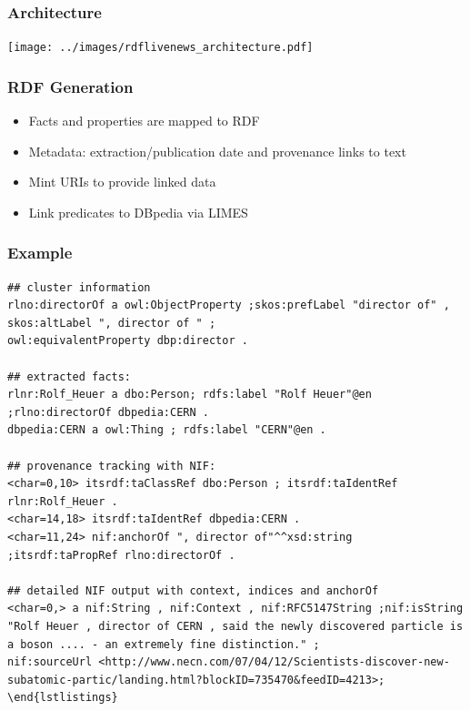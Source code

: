 \documentclass{beamer}
\begin{document}
\begin{frame}
    \frametitle{Architecture}
        \texttt{[image: ../images/rdflivenews\_architecture.pdf]}
\end{frame}



\begin{frame}
    \frametitle{RDF Generation}
    \begin{itemize}
        \item Facts and properties are mapped to RDF
        \item Metadata: extraction/publication date and provenance links to text
        \item Mint URIs to provide linked data
        \item Link predicates to DBpedia via LIMES
    \end{itemize}
\end{frame}


\begin{frame}[fragile]
\frametitle{Example}
    \begin{lstlisting}
## cluster information
rlno:directorOf a owl:ObjectProperty ;skos:prefLabel "director of" ,
skos:altLabel ", director of " ;
owl:equivalentProperty dbp:director .

## extracted facts:
rlnr:Rolf_Heuer a dbo:Person; rdfs:label "Rolf Heuer"@en ;rlno:directorOf dbpedia:CERN .
dbpedia:CERN a owl:Thing ; rdfs:label "CERN"@en .

## provenance tracking with NIF:
<char=0,10> itsrdf:taClassRef dbo:Person ; itsrdf:taIdentRef rlnr:Rolf_Heuer .
<char=14,18> itsrdf:taIdentRef dbpedia:CERN .
<char=11,24> nif:anchorOf ", director of"^^xsd:string ;itsrdf:taPropRef rlno:directorOf .

## detailed NIF output with context, indices and anchorOf
<char=0,> a nif:String , nif:Context , nif:RFC5147String ;nif:isString "Rolf Heuer , director of CERN , said the newly discovered particle is a boson .... - an extremely fine distinction." ;
nif:sourceUrl <http://www.necn.com/07/04/12/Scientists-discover-new-subatomic-partic/landing.html?blockID=735470&feedID=4213>;
\end{lstlistings}
    \end{lstlisting}

\end{frame}
\end{document}
